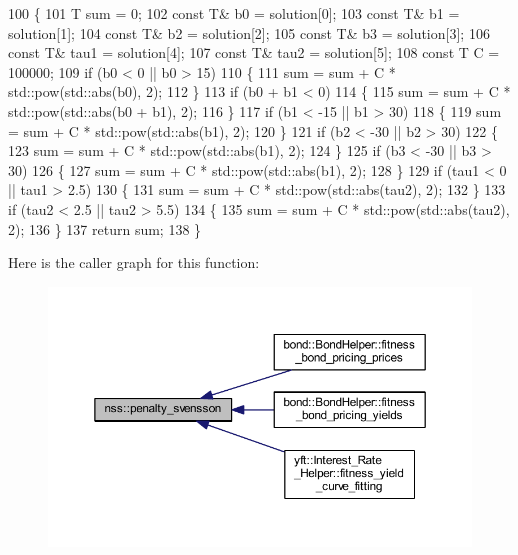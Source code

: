\begin{DoxyCode}
100     \{
101         T sum = 0;
102         \textcolor{keyword}{const} T& b0 = solution[0];
103         \textcolor{keyword}{const} T& b1 = solution[1];
104         \textcolor{keyword}{const} T& b2 = solution[2];
105         \textcolor{keyword}{const} T& b3 = solution[3];
106         \textcolor{keyword}{const} T& tau1 = solution[4];
107         \textcolor{keyword}{const} T& tau2 = solution[5];
108         \textcolor{keyword}{const} T C = 100000;
109         \textcolor{keywordflow}{if} (b0 < 0 || b0 > 15)
110         \{
111             sum = sum + C * std::pow(std::abs(b0), 2);
112         \}
113         \textcolor{keywordflow}{if} (b0 + b1 < 0)
114         \{
115             sum = sum + C * std::pow(std::abs(b0 + b1), 2);
116         \}
117         \textcolor{keywordflow}{if} (b1 < -15 || b1 > 30)
118         \{
119             sum = sum + C * std::pow(std::abs(b1), 2);
120         \}
121         \textcolor{keywordflow}{if} (b2 < -30 || b2 > 30)
122         \{
123             sum = sum + C * std::pow(std::abs(b1), 2);
124         \}
125         \textcolor{keywordflow}{if} (b3 < -30 || b3 > 30)
126         \{
127             sum = sum + C * std::pow(std::abs(b1), 2);
128         \}
129         \textcolor{keywordflow}{if} (tau1 < 0 || tau1 > 2.5)
130         \{
131             sum = sum + C * std::pow(std::abs(tau2), 2);
132         \}
133         \textcolor{keywordflow}{if} (tau2 < 2.5 || tau2 > 5.5)
134         \{
135             sum = sum + C * std::pow(std::abs(tau2), 2);
136         \}
137         \textcolor{keywordflow}{return} sum;
138     \}
\end{DoxyCode}
Here is the caller graph for this function\+:
\nopagebreak
\begin{figure}[H]
\begin{center}
\leavevmode
\includegraphics[width=350pt]{namespacenss_a009a0ebbca20f7969d0c2ed5a241aa82_icgraph}
\end{center}
\end{figure}
\mbox{\label{namespacenss_a71aad246261afa16f8bb1a4057570d4b}} 
